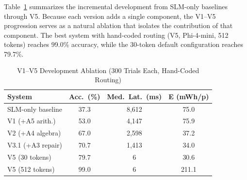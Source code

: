 \documentclass[journal]{IEEEtai}
\begin{document}

Table~\ref{tab:main_results} summarizes the incremental development from SLM-only baselines through V5. Because each version adds a single component, the V1--V5 progression serves as a natural ablation that isolates the contribution of that component. The best system with hand-coded routing (V5, Phi-4-mini, 512 tokens) reaches 99.0\% accuracy, while the 30-token default configuration reaches 79.7\%.

\begin{table}[t]
\centering
\caption{V1--V5 Development Ablation (300 Trials Each, Hand-Coded Routing)}
\label{tab:main_results}
\begin{tabular}{lccc}
\hline
\textbf{System} & \textbf{Acc.\ (\%)} & \textbf{Med.\ Lat.\ (ms)} & \textbf{E (mWh/p)} \\
\hline
SLM-only baseline & 37.3 & 8,612 & 75.0 \\
V1 (+A5 arith.) & 53.0 & 4,147 & 75.9 \\
V2 (+A4 algebra) & 67.0 & 2,598 & 37.2 \\
V3.1 (+A3 repair) & 70.7 & 1,413 & 34.0 \\
V5 (30 tokens) & 79.7 & 6 & 30.6 \\
V5 (512 tokens) & 99.0 & 6 & 211.1 \\
\hline
\end{tabular}
\end{table}
\end{document}
